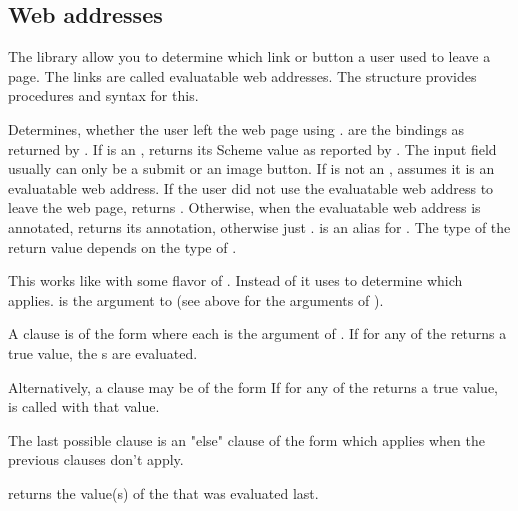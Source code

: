 \subsection{Web addresses}

The \surflets library allow you to determine which link or button a
  user used to leave a page.  The links are called evaluatable web
  addresses.  The  structure provides
  procedures and syntax for this.

\begin{desc}
  Determines, whether the user left the web page using
  .   are the bindings as returned by
  .  If  is an ,
   returns its Scheme value as reported by
  .  The input field usually can only be a
  submit or an image button.  If  is not an
  ,  assumes it is an evaluatable web
  address.  If the user did not use the evaluatable web address to
  leave the web page,  returns \sharpf.  Otherwise,
  when the evaluatable web address is annotated, 
  returns its annotation, otherwise just \sharpt.  
  is an alias for .  The type of the return value
  depends on the type of .
\end{desc}

\begin{desc}
  This works like  with some flavor of .  Instead of
    it uses  to determine which
   applies.   is the 
  argument to  (see above for the arguments of
  ).  

  A clause is of the form
  where each  is the  argument of
  .   If for any of the 
   returns a true value, the s are
  evaluated.  

  Alternatively, a clause may be of the form
  If for any of the   returns a true
  value,  is called with that value.  

  The last possible clause is an "else" clause of the form
  which applies when the previous clauses don't apply.

   returns the value(s) of the
   that was evaluated last.
\end{desc}

